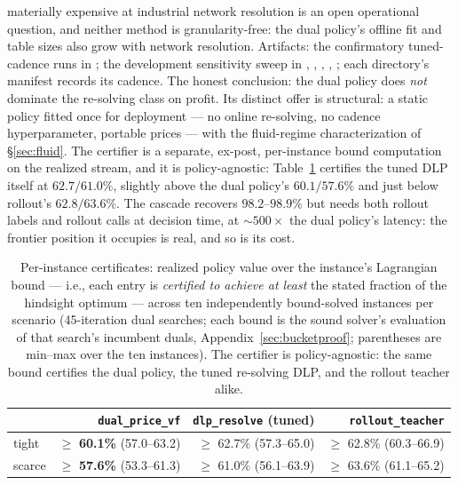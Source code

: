 \documentclass[11pt]{article}
\begin{document}
materially expensive at industrial network resolution is an open
operational question, and neither method is granularity-free: the
dual policy's offline fit and table sizes also grow with network
resolution.
Artifacts: the confirmatory tuned-cadence runs in
; the development
sensitivity sweep in ,
,
, , ; each directory's
manifest records its cadence. The
honest conclusion: the dual policy does \emph{not} dominate the
re-solving class on profit. Its distinct offer is structural: a
static policy fitted once for deployment --- no online re-solving, no
cadence hyperparameter, portable prices --- with the fluid-regime
characterization of \S\ref{sec:fluid}. The certifier is a separate,
ex-post, per-instance bound computation on the realized stream, and
it is policy-agnostic: Table~\ref{tab:certs} certifies
the tuned DLP itself at $62.7/61.0\%$, slightly above the dual
policy's $60.1/57.6\%$ and just below rollout's $62.8/63.6\%$. The cascade recovers $98.2$--$98.9\%$ but
needs both rollout labels and rollout calls at decision time, at
${\sim}500\times$ the dual policy's latency: the frontier position it
occupies is real, and so is its cost.

\begin{table}[t]
\centering
\caption{Per-instance certificates: realized policy value over the
instance's Lagrangian bound --- i.e., each entry is \emph{certified to
achieve at least} the stated fraction of the hindsight optimum ---
across ten independently bound-solved instances per scenario
(45-iteration dual searches; each bound is the sound solver's
evaluation of that search's incumbent duals,
Appendix~\ref{sec:bucketproof}; parentheses are min--max over the ten
instances). The certifier is policy-agnostic: the same bound
certifies the dual policy, the tuned re-solving DLP, and the rollout
teacher alike.}
\label{tab:certs}
\small
\begin{tabular}{lrrr}
\toprule
 & \texttt{dual\_price\_vf} & \texttt{dlp\_resolve} (tuned) & \texttt{rollout\_teacher} \\
\midrule
tight & $\geq$ \textbf{60.1\%} (57.0--63.2) & $\geq$ 62.7\% (57.3--65.0) & $\geq$ 62.8\% (60.3--66.9) \\
scarce & $\geq$ \textbf{57.6\%} (53.3--61.3) & $\geq$ 61.0\% (56.1--63.9) & $\geq$ 63.6\% (61.1--65.2) \\
\bottomrule
\end{tabular}
\end{table}
\end{document}

